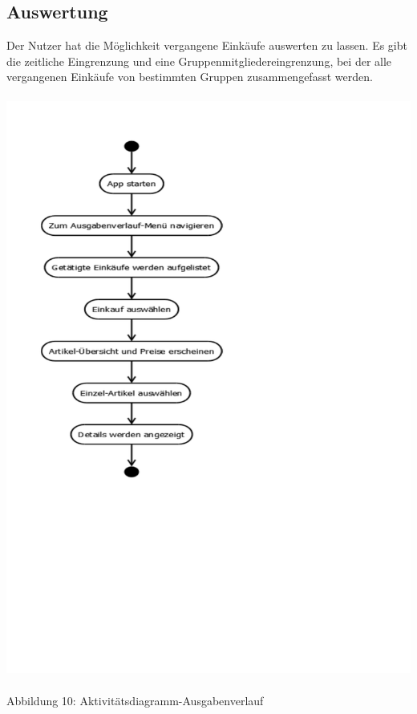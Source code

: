 \documentclass[12pt,a4paper]{article}
\begin{document}
\subsection{Auswertung}
Der Nutzer hat die Möglichkeit vergangene Einkäufe auswerten zu lassen. Es gibt die zeitliche Eingrenzung und eine Gruppenmitgliedereingrenzung, bei der alle vergangenen Einkäufe von bestimmten Gruppen zusammengefasst werden.
\\
\\
\hspace*{-10mm} 
\includegraphics[trim = 17mm 130mm 0mm 20mm, clip, scale=0.9]{Aktiv-Ausgabe.pdf}
\\
\\
\footnotesize Abbildung 10: Aktivitätsdiagramm-Ausgabenverlauf
\normalsize
\\
\\
\end{document}
